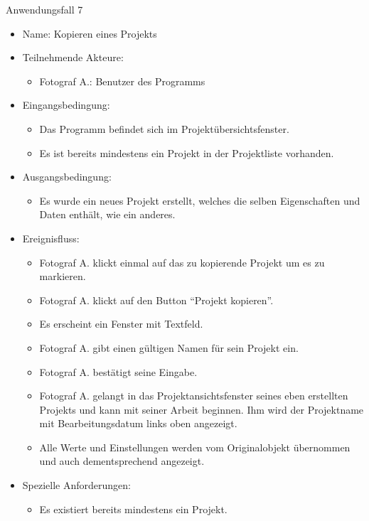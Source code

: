 \begin{itemize}
	\begin{description}
		\item[Anwendungsfall 7]
	\end{description}
	
		\begin{itemize}
			\item Name: Kopieren eines Projekts
			\item Teilnehmende Akteure:
			\begin{itemize}
				\item	Fotograf A.: Benutzer des Programms		
			\end{itemize}
			\item Eingangsbedingung:
			\begin{itemize}
				\item	Das Programm befindet sich im Projektübersichtsfenster.
				\item Es ist bereits mindestens ein Projekt in der Projektliste vorhanden.			
			\end{itemize}
			\item Ausgangsbedingung:
			\begin{itemize}
				\item	Es wurde ein neues Projekt erstellt, welches die selben Eigenschaften und Daten enthält, wie ein anderes.	
			\end{itemize}
			\item Ereignisfluss:
			\begin{itemize}
				\item Fotograf A. klickt einmal auf das zu kopierende Projekt um es zu markieren.
				\item Fotograf A. klickt auf den Button "`Projekt kopieren"'.
				\item Es erscheint ein Fenster mit Textfeld.
				\item Fotograf A. gibt einen gültigen Namen für sein Projekt ein.
				\item Fotograf A. bestätigt seine Eingabe.
				\item Fotograf A. gelangt in das Projektansichtsfenster seines eben erstellten Projekts und kann mit seiner Arbeit beginnen. Ihm wird der Projektname mit Bearbeitungsdatum links oben angezeigt.
				\item Alle Werte und Einstellungen werden vom Originalobjekt übernommen und auch dementsprechend angezeigt.
			\end{itemize}
			\item Spezielle Anforderungen:
			\begin{itemize}
				\item	Es existiert bereits mindestens ein Projekt.		
			\end{itemize}			
		\end{itemize}
		

\end{itemize}
